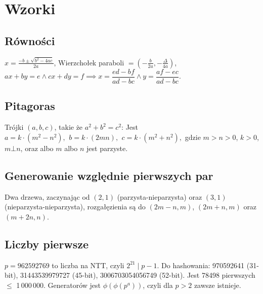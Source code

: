 \chapter{Wzorki}

\section{Równości}
$x = \frac{-b\pm\sqrt{b^2-4ac}}{2a}$,
Wierzchołek paraboli $= (- \frac{b}{2a}, - \frac{\Delta}{4a})$,
$ax+by=e \wedge cx+dy=f \implies
x=\dfrac{ed-bf}{ad-bc} \wedge y=\dfrac{af-ec}{ad-bc}$.

\section{Pitagoras}
Trójki $(a, b, c)$, takie że $a^2+b^2=c^2$:
 Jest $a=k\cdot (m^{2}-n^{2}),\ \,b=k\cdot (2mn),\ \,c=k\cdot (m^{2}+n^{2}),$
 gdzie $m > n > 0$, $k > 0$, $m \bot n$, oraz albo $m$ albo $n$ jest parzyste.

\section{Generowanie względnie pierwszych par}
Dwa drzewa, zaczynając od $(2, 1)$ (parzysta-nieparzysta) oraz $(3, 1)$ (nieparzysta-nieparzysta), rozgałęzienia są do $(2m-n,m)$, $(2m+n,m)$ oraz $(m+2n,n)$.

\section{Liczby pierwsze}
	$p=962592769$ to liczba na NTT, czyli $2^{21} \mid p-1$. Do hashowania:
	970592641 (31-bit), 31443539979727 (45-bit), 3006703054056749 (52-bit). 
	Jest 78498 pierwszych $\leq$ 1\,000\,000.
	Generatorów jest $\phi(\phi(p^a))$, czyli dla $p>2$ zawsze istnieje.

